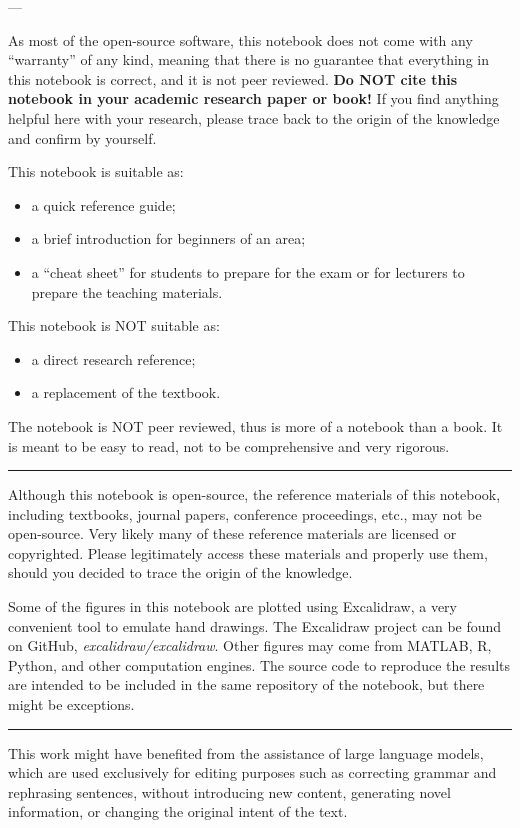 \noindent ---

\noindent As most of the open-source software, this notebook does not come with any ``warranty'' of any kind, meaning that there is no guarantee that everything in this notebook is correct, and it is not peer reviewed. \textbf{Do NOT cite this notebook in your academic research paper or book!} If you find anything helpful here with your research, please trace back to the origin of the knowledge and confirm by yourself.

This notebook is suitable as:
\begin{itemize}
  \item a quick reference guide;
  \item a brief introduction for beginners of an area;
  \item a ``cheat sheet'' for students to prepare for the exam or for lecturers to prepare the teaching materials.
\end{itemize}

This notebook is NOT suitable as:
\begin{itemize}
  \item a direct research reference;
  \item a replacement of the textbook.
\end{itemize}
The notebook is NOT peer reviewed, thus is more of a notebook than a book. It is meant to be easy to read, not to be comprehensive and very rigorous.

\vspace{0.1in}
\noindent \rule{1in}{0.4pt}
\vspace{0.1in}

Although this notebook is open-source, the reference materials of this notebook, including textbooks, journal papers, conference proceedings, etc., may not be open-source. Very likely many of these reference materials are licensed or copyrighted. Please legitimately access these materials and properly use them, should you decided to trace the origin of the knowledge.

Some of the figures in this notebook are plotted using Excalidraw, a very convenient tool to emulate hand drawings. The Excalidraw project can be found on GitHub, \textit{excalidraw/excalidraw}. Other figures may come from MATLAB, R, Python, and other computation engines. The source code to reproduce the results are intended to be included in the same repository of the notebook, but there might be exceptions.

\vspace{0.1in}
\noindent \rule{1in}{0.4pt}
\vspace{0.1in}

This work might have benefited from the assistance of large language models, which are used exclusively for editing purposes such as correcting grammar and rephrasing sentences, without introducing new content, generating novel information, or changing the original intent of the text.


